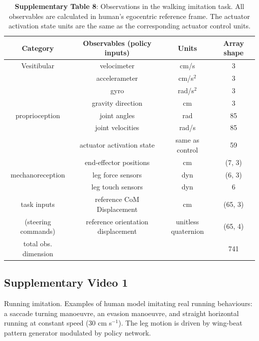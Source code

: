 \documentclass[sn-mathphys-num]{sn-jnl}%
\theoremstyle{thmstyleone}%
\theoremstyle{thmstyletwo}%
\theoremstyle{thmstylethree}%
\begin{document}
\begin{appendices}
\begin{table}[htbp]
	\centering
	\small
	\caption{\textbf{Supplementary Table 8}: 
		Observations in the walking imitation task. 
		All observables are calculated in human's egocentric reference frame.
		The actuator activation state units are the same as the corresponding actuator control units.}
	\begin{tabular}{cccc}
		\toprule
		Category         &        Observables (policy inputs)  & Units  & Array shape  \\
		\midrule
		Vesitibular     &  velocimeter      &   cm/s & 3  \\
		&  accelerameter      &   cm/s$ ^2 $ & 3  \\
		&  gyro      &   rad/s$ ^2 $ & 3  \\
		&  gravity direction      &   cm & 3  \\
		\midrule
		proprioception     &  joint angles      &   rad & 85  \\
		&  joint velocities      &   rad/s & 85  \\
		&  actuator activation state      &   same as control & 59  \\
		&  end-effector positions      &   cm & (7, 3)  \\
		\midrule
		mechanoreception     &  leg force sensors      &   dyn & (6, 3)  \\
		     &  leg touch sensors      &   dyn & 6  \\
		\midrule
		task inputs     &  reference CoM Displacement      &   cm & (65, 3)  \\
		(steering commands)     &  reference orientation displacement      &   \makecell{unitless \\quaternion} & (65, 4)  \\
		\midrule
		total obs. dimension     &        &    & 741  \\
		\bottomrule
	\end{tabular}%
	\label{tab:s_8}%
\end{table}%


\subsection{Supplementary Video 1} \label{sec:NFT}

Running imitation. 
Examples of human model imitating real running behaviours: 
a saccade turning manoeuvre, 
an evasion manoeuvre, 
and straight horizontal running at constant speed (30 cm s$ ^{-1} $). 
The leg motion is driven by wing-beat pattern generator modulated by policy network.



\end{appendices}
\end{document}
